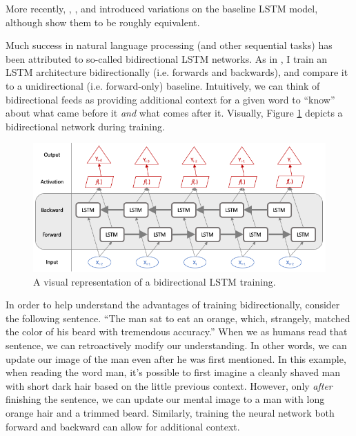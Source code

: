 \documentclass{article}
\begin{document}
	More recently, \citet{gers2000recurrent}, \citet{chung2014empirical}, and \citet{yao2015depth} introduced variations on the baseline \citet{hochreiter1997long} LSTM model, although \citet{greff2016lstm} show them to be roughly equivalent. 
	
	Much success in natural language processing (and other sequential tasks) has been attributed to so-called bidirectional LSTM networks. As in \citet{wang2015unified}, I train an LSTM architecture bidirectionally (i.e. forwards and backwards), and compare it to a unidirectional (i.e. forward-only) baseline. Intuitively, we can think of bidirectional feeds as providing additional context for a given word to ``know'' about what came before it \textit{and} what comes after it. Visually, Figure \ref{fig:bidirectional} depicts a bidirectional network during training. 
	 
	 \begin{figure}[H]
	 	\includegraphics[width=\textwidth]{figures/images/bidirectional-net.png}
	 	\caption{A visual representation of a bidirectional LSTM training.}
	 	\label{fig:bidirectional}
	 \end{figure}
	
	In order to help understand the advantages of training bidirectionally, consider the following sentence. ``The man sat to eat an orange, which, strangely, matched the color of his beard with tremendous accuracy.'' When we as humans read that sentence, we can retroactively modify our understanding. In other words, we can update our image of the man even after he was first mentioned. In this example, when reading the word man, it's possible to first imagine a cleanly shaved man with short dark hair based on the little previous context. However, only \textit{after} finishing the sentence, we can update our mental image to a man with long orange hair and a trimmed beard. Similarly, training the neural network both forward and backward can allow for additional context. 
	
\end{document}
